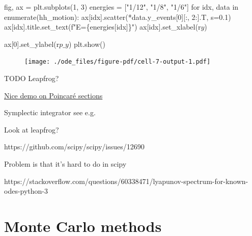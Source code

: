 \documentclass[
  letterpaper,
  DIV=11,
  numbers=noendperiod]{scrreprt}
\newenvironment{Shaded}{\begin{snugshade}}{\end{snugshade}}
\newcommand{\BuiltInTok}[1]{\textcolor[rgb]{0.00,0.23,0.31}{#1}}
\newcommand{\ControlFlowTok}[1]{\textcolor[rgb]{0.00,0.23,0.31}{#1}}
\newcommand{\DecValTok}[1]{\textcolor[rgb]{0.68,0.00,0.00}{#1}}
\newcommand{\FloatTok}[1]{\textcolor[rgb]{0.68,0.00,0.00}{#1}}
\newcommand{\KeywordTok}[1]{\textcolor[rgb]{0.00,0.23,0.31}{#1}}
\newcommand{\NormalTok}[1]{\textcolor[rgb]{0.00,0.23,0.31}{#1}}
\newcommand{\OperatorTok}[1]{\textcolor[rgb]{0.37,0.37,0.37}{#1}}
\newcommand{\SpecialCharTok}[1]{\textcolor[rgb]{0.37,0.37,0.37}{#1}}
\newcommand{\SpecialStringTok}[1]{\textcolor[rgb]{0.13,0.47,0.30}{#1}}
\newcommand{\StringTok}[1]{\textcolor[rgb]{0.13,0.47,0.30}{#1}}
\newcommand{\VerbatimStringTok}[1]{\textcolor[rgb]{0.13,0.47,0.30}{#1}}
\theoremstyle{definition}
\theoremstyle{remark}
\begin{document}
\begin{Shaded}
\begin{Highlighting}[]
\NormalTok{fig, ax }\OperatorTok{=}\NormalTok{ plt.subplots(}\DecValTok{1}\NormalTok{, }\DecValTok{3}\NormalTok{)}
\NormalTok{energies }\OperatorTok{=}\NormalTok{ [}\StringTok{"1/12"}\NormalTok{, }\StringTok{"1/8"}\NormalTok{, }\StringTok{"1/6"}\NormalTok{]}
\ControlFlowTok{for}\NormalTok{ idx, data }\KeywordTok{in} \BuiltInTok{enumerate}\NormalTok{(hh\_motion): }
\NormalTok{        ax[idx].scatter(}\OperatorTok{*}\NormalTok{data.y\_events[}\DecValTok{0}\NormalTok{][:, }\DecValTok{2}\NormalTok{:].T, s}\OperatorTok{=}\FloatTok{0.1}\NormalTok{)}
\NormalTok{        ax[idx].title.set\_text(}\SpecialStringTok{f"E=}\SpecialCharTok{\{}\NormalTok{energies[idx]}\SpecialCharTok{\}}\SpecialStringTok{"}\NormalTok{)        }
\NormalTok{        ax[idx].set\_xlabel(}\VerbatimStringTok{r\textquotesingle{}$y$\textquotesingle{}}\NormalTok{)}

\NormalTok{ax[}\DecValTok{0}\NormalTok{].set\_ylabel(}\VerbatimStringTok{r\textquotesingle{}$p\_y$\textquotesingle{}}\NormalTok{)}
\NormalTok{plt.show()}
\end{Highlighting}
\end{Shaded}

\begin{figure}[H]

{\centering \texttt{[image: ./ode\_files/figure-pdf/cell-7-output-1.pdf]}

}

\end{figure}

TODO Leapfrog?

\href{https://duetosymmetry.com/tool/poincare-section-clicker-toy/}{Nice
demo on Poincaré sections}

Symplectic integrator see e.g.~

Look at leapfrog?

https://github.com/scipy/scipy/issues/12690

Problem is that it's hard to do in scipy

https://stackoverflow.com/questions/60338471/lyapunov-spectrum-for-known-odes-python-3


\hypertarget{monte-carlo-methods}{%
\chapter{Monte Carlo methods}\label{monte-carlo-methods}}
\end{document}
